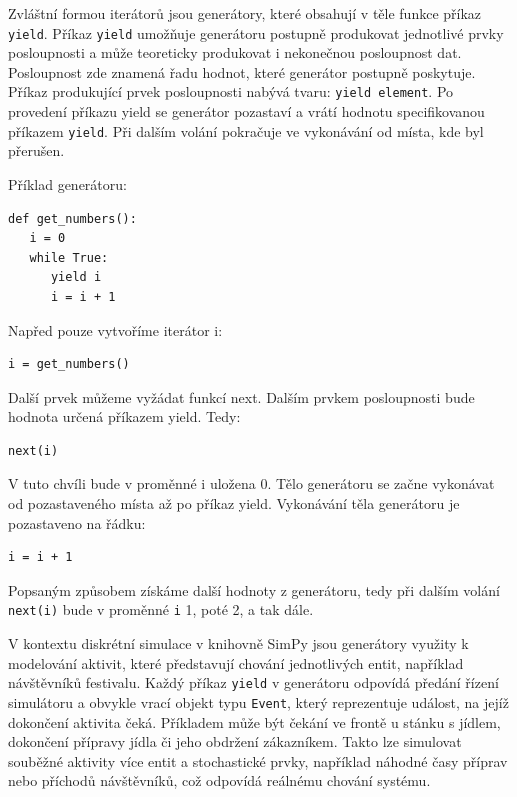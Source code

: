 \documentclass[
  program=itp,
  biblatex,
  figures=false,
  glossaries,
  index
]{kidiplom}
\begin{document}
Zvláštní formou iterátorů jsou generátory, které obsahují v těle funkce příkaz \texttt{yield}. Příkaz \texttt{yield} umožňuje generátoru postupně produkovat jednotlivé prvky posloupnosti a může teoreticky produkovat i nekonečnou posloupnost dat. Posloupnost zde znamená řadu hodnot, které generátor postupně poskytuje. Příkaz produkující prvek posloupnosti nabývá tvaru: \texttt{yield element}. Po provedení příkazu yield se generátor pozastaví a vrátí hodnotu specifikovanou příkazem \texttt{yield}. Při dalším volání pokračuje ve vykonávání od místa, kde byl přerušen.

\noindent Příklad generátoru:
 \begin{verbatim} 
def get_numbers():
   i = 0
   while True:
      yield i
      i = i + 1
\end{verbatim}
Napřed pouze vytvoříme iterátor i: 
 \begin{verbatim} 
i = get_numbers()
\end{verbatim}
Další prvek můžeme vyžádat funkcí next. 
Dalším prvkem posloupnosti bude hodnota určená příkazem yield. Tedy:
 \begin{verbatim} 
next(i)
\end{verbatim}
V tuto chvíli bude v proměnné i uložena 0. Tělo generátoru se začne vykonávat od pozastaveného místa až po příkaz yield.  Vykonávání těla generátoru je pozastaveno na řádku:
 \begin{verbatim} 
i = i + 1
\end{verbatim}
Popsaným způsobem získáme další hodnoty z generátoru, tedy při dalším volání \texttt{next(i)} bude v proměnné \texttt{i} 1, poté 2, a tak dále.

V kontextu diskrétní simulace v knihovně SimPy jsou generátory využity k modelování aktivit, které představují chování jednotlivých entit, například návštěvníků festivalu. Každý příkaz \texttt{yield} v generátoru odpovídá předání řízení simulátoru a obvykle vrací objekt typu \texttt{Event}, který reprezentuje událost, na jejíž dokončení aktivita čeká. Příkladem může být čekání ve frontě u stánku s jídlem, dokončení přípravy jídla či jeho obdržení zákazníkem. Takto lze simulovat souběžné aktivity více entit a stochastické prvky, například náhodné časy příprav nebo příchodů návštěvníků, což odpovídá reálnému chování systému.
\end{document}
